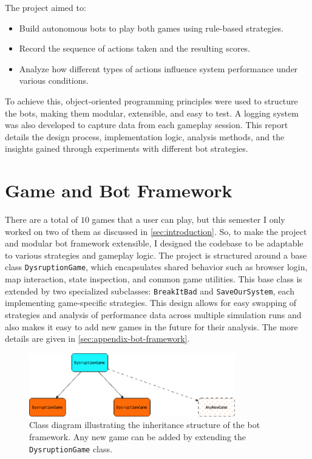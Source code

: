\documentclass[12pt,a4paper]{article}
\begin{document}
    The project aimed to:
    \begin{itemize}
        \item Build autonomous bots to play both games using rule-based strategies.
        \item Record the sequence of actions taken and the resulting scores.
        \item Analyze how different types of actions influence system performance under various conditions.
    \end{itemize}

    To achieve this, object-oriented programming principles were used to structure the bots, making them modular, extensible, and easy to test. A logging system was also developed to capture data from each gameplay session. This report details the design process, implementation logic, analysis methods, and the insights gained through experiments with different bot strategies.

\section{Game and Bot Framework}
\label{sec:game-bot-framework}
    There are a total of $10$ games that a user can play, but this semester I only worked on two of them as discussed in \cref{sec:introduction}. So, to make the project and modular bot framework extensible, I designed the codebase to be adaptable to various strategies and gameplay logic. The project is structured around a base class \texttt{DysruptionGame}, which encapsulates shared behavior such as browser login, map interaction, state inspection, and common game utilities. This base class is extended by two specialized subclasses: \texttt{BreakItBad} and \texttt{SaveOurSystem}, each implementing game-specific strategies. This design allows for easy swapping of strategies and analysis of performance data across multiple simulation runs and also makes it easy to add new games in the future for their analysis. The more details are given in \cref{sec:appendix-bot-framework}.

    \begin{figure}[h!]
        \centering
        \includegraphics[width=0.8\textwidth]{images/class.png}
        \caption{Class diagram illustrating the inheritance structure of the bot framework. Any new game can be added by extending the \texttt{DysruptionGame} class.}
        \label{fig:class-diagram}
    \end{figure}
\end{document}
